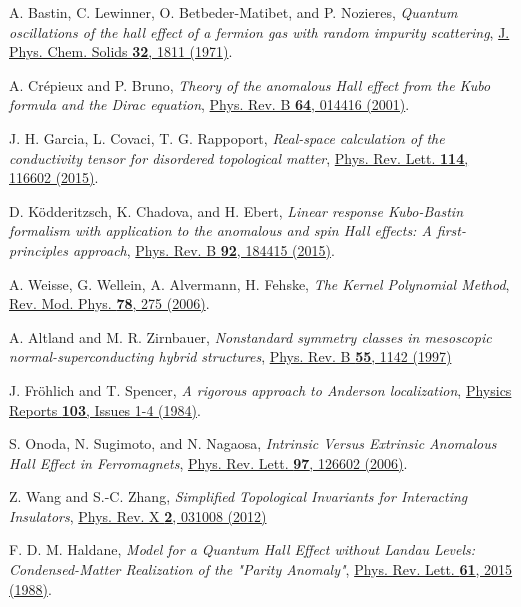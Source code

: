 \documentclass[aps,prl,amsmath,amssymb,twocolumn, superscriptaddress]{revtex4-2}
\newcommand{\BM}[1]{{\color{orange} #1}}
\begin{document}
\begin{thebibliography}{10}
A. Bastin, C. Lewinner, O. Betbeder-Matibet, and P.
Nozieres, {\em Quantum oscillations of the hall effect of a fermion gas with random impurity scattering}, \href{https://www.sciencedirect.com/science/article/pii/S0022369771801476}{ J. Phys. Chem. Solids {\bfseries 32}, 1811 (1971)}.

A. Cr\'epieux and P. Bruno, {\em Theory of the anomalous Hall effect from the Kubo formula and the Dirac equation}, \href{https://journals.aps.org/prb/abstract/10.1103/PhysRevB.64.014416}{Phys. Rev. B {\bfseries 64}, 014416 (2001)}.

J. H. Garcia, L.  Covaci, T. G. Rappoport, {\em Real-space calculation of the conductivity tensor for disordered topological matter}, \href{https://journals.aps.org/prl/abstract/10.1103/PhysRevLett.114.116602}{Phys. Rev. Lett. {\bfseries 114}, 116602 (2015)}.

D. Ködderitzsch, K. Chadova, and H. Ebert, {\em Linear response Kubo-Bastin formalism with application to the anomalous and spin Hall effects: A first-principles approach}, \href{https://journals.aps.org/prb/abstract/10.1103/PhysRevB.92.184415}{Phys. Rev. B {\bfseries 92}, 184415 (2015)}.

A. Weisse, G. Wellein, A. Alvermann, H. Fehske, {\em The Kernel Polynomial Method}, \href{https://journals.aps.org/rmp/abstract/10.1103/RevModPhys.78.275}{Rev. Mod. Phys. {\bfseries 78}, 275 (2006)}.

A. Altland and M. R. Zirnbauer, {\em Nonstandard symmetry classes in mesoscopic normal-superconducting hybrid structures}, \href{https://journals.aps.org/prb/abstract/10.1103/PhysRevB.55.1142}{Phys. Rev. B {\bfseries 55}, 1142 (1997)}

\BM{
J. Fröhlich and T. Spencer, {\em A rigorous approach to Anderson localization}, \href{https://www.sciencedirect.com/science/article/pii/0370157384900619}{Physics Reports {\bfseries 103}, Issues 1-4 (1984)}.

\bibitem{RS_GF_2}
S. Onoda, N. Sugimoto, and N. Nagaosa, {\em Intrinsic Versus Extrinsic Anomalous Hall Effect in Ferromagnets}, \href{https://journals.aps.org/prl/abstract/10.1103/PhysRevLett.97.126602}{Phys. Rev. Lett. {\bfseries 97}, 126602 (2006)}.

\bibitem{GF_topology_2}
Z. Wang and S.-C. Zhang, {\em Simplified Topological Invariants for Interacting Insulators}, \href{https://journals.aps.org/prx/abstract/10.1103/PhysRevX.2.031008}{Phys. Rev. X {\bfseries 2}, 031008 (2012)}

}

F. D. M. Haldane, {\em Model for a Quantum Hall Effect without Landau Levels: Condensed-Matter Realization of the "Parity Anomaly"}, \href{https://journals.aps.org/prl/abstract/10.1103/PhysRevLett.61.2015}{Phys. Rev. Lett. {\bfseries 61}, 2015 (1988)}.

\end{thebibliography}
\end{document}
